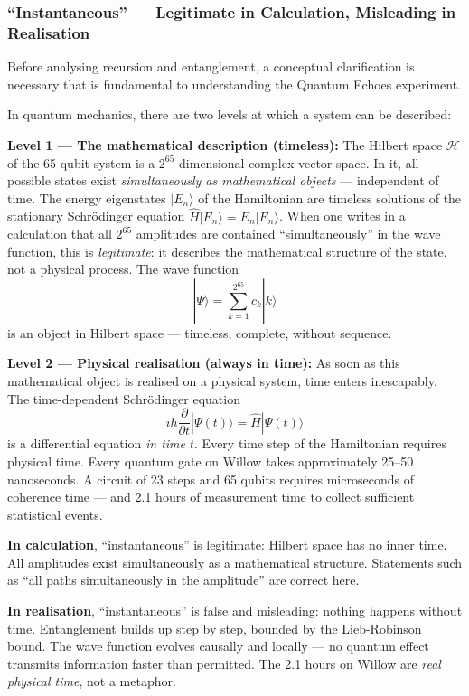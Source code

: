 \subsubsection*{``Instantaneous'' — Legitimate in Calculation, Misleading in Realisation}

Before analysing recursion and entanglement, a conceptual clarification is necessary
that is fundamental to understanding the Quantum Echoes experiment.

In quantum mechanics, there are two levels at which a system can be described:

\textbf{Level 1 — The mathematical description (timeless):}
The Hilbert space $\mathcal{H}$ of the 65-qubit system is a $2^{65}$-dimensional
complex vector space. In it, all possible states exist \emph{simultaneously as
mathematical objects} — independent of time. The energy eigenstates $|E_n\rangle$
of the Hamiltonian are timeless solutions of the stationary Schrödinger equation
$\hat{H}|E_n\rangle = E_n|E_n\rangle$.
When one writes in a calculation that all $2^{65}$ amplitudes are contained
``simultaneously'' in the wave function, this is \emph{legitimate}: it describes
the mathematical structure of the state, not a physical process. The wave function
\begin{equation}
    |\Psi\rangle = \sum_{k=1}^{2^{65}} c_k |k\rangle
\end{equation}
is an object in Hilbert space — timeless, complete, without sequence.

\textbf{Level 2 — Physical realisation (always in time):}
As soon as this mathematical object is realised on a physical system, time enters
inescapably. The time-dependent Schrödinger equation
\begin{equation}
    i\hbar \frac{\partial}{\partial t}|\Psi(t)\rangle = \hat{H}|\Psi(t)\rangle
\end{equation}
is a differential equation \emph{in time $t$}. Every time step of the Hamiltonian
requires physical time. Every quantum gate on Willow takes approximately 25--50
nanoseconds. A circuit of 23 steps and 65 qubits requires microseconds of coherence
time — and 2.1 hours of measurement time to collect sufficient statistical events.

\begin{important}
\textbf{In calculation}, ``instantaneous'' is legitimate: Hilbert space has no
inner time. All amplitudes exist simultaneously as a mathematical structure.
Statements such as ``all paths simultaneously in the amplitude'' are correct here.

\textbf{In realisation}, ``instantaneous'' is false and misleading: nothing happens
without time. Entanglement builds up step by step, bounded by the Lieb-Robinson
bound. The wave function evolves causally and locally — no quantum effect transmits
information faster than permitted. The 2.1 hours on Willow are \emph{real physical
time}, not a metaphor.
\end{important}

